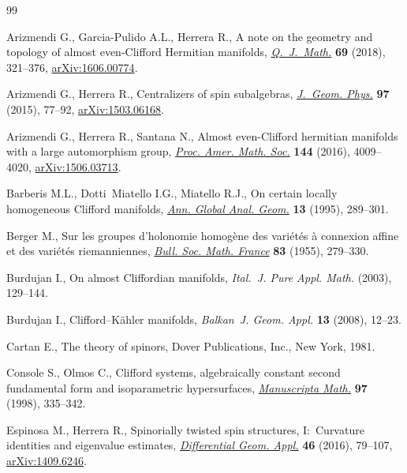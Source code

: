\begin{thebibliography}{99}
\footnotesize\itemsep=0pt

Arizmendi G., Garcia-Pulido A.L., Herrera R., A note on the geometry and
 topology of almost even-{C}lifford {H}ermitian manifolds,
 \href{https://doi.org/10.1093/qmath/hax040}{\textit{Q.~J.~Math.}} \textbf{69} (2018), 321--376, \href{https://arxiv.org/abs/1606.00774}{arXiv:1606.00774}.

Arizmendi G., Herrera R., Centralizers of spin subalgebras, \href{https://doi.org/10.1016/j.geomphys.2015.07.002}{\textit{J.~Geom.
 Phys.}} \textbf{97} (2015), 77--92, \href{https://arxiv.org/abs/1503.06168}{arXiv:1503.06168}.

Arizmendi G., Herrera R., Santana N., Almost even-{C}lifford hermitian
 manifolds with a large automorphism group, \href{https://doi.org/10.1090/proc/13071}{\textit{Proc. Amer. Math. Soc.}}
 \textbf{144} (2016), 4009--4020, \href{https://arxiv.org/abs/1506.03713}{arXiv:1506.03713}.

Barberis M.L., Dotti~Miatello I.G., Miatello R.J., On certain locally
 homogeneous {C}lifford manifolds, \href{https://doi.org/10.1007/BF00773661}{\textit{Ann. Global Anal. Geom.}}
 \textbf{13} (1995), 289--301.

Berger M., Sur les groupes d'holonomie homog\`ene des vari\'{e}t\'{e}s \`a
 connexion affine et des vari\'{e}t\'{e}s riemanniennes, \href{https://doi.org/10.24033/bsmf.1464}{\textit{Bull. Soc.
 Math. France}} \textbf{83} (1955), 279--330.

Burdujan I., On almost {C}liffordian manifolds, \textit{Ital.~J. Pure Appl.
 Math.} (2003), 129--144.

Burdujan I., Clifford--{K}\"{a}hler manifolds, \textit{Balkan~J. Geom. Appl.}
 \textbf{13} (2008), 12--23.

Cartan E., The theory of spinors, Dover Publications, Inc., New York, 1981.

Console S., Olmos C., Clifford systems, algebraically constant second
 fundamental form and isoparametric hypersurfaces, \href{https://doi.org/10.1007/s002290050106}{\textit{Manuscripta Math.}}
 \textbf{97} (1998), 335--342.

Espinosa M., Herrera R., Spinorially twisted spin structures, {I}:~{C}urvature
 identities and eigenvalue estimates, \href{https://doi.org/10.1016/j.difgeo.2016.01.008}{\textit{Differential Geom. Appl.}}
 \textbf{46} (2016), 79--107, \href{https://arxiv.org/abs/1409.6246}{arXiv:1409.6246}.


\end{thebibliography}
